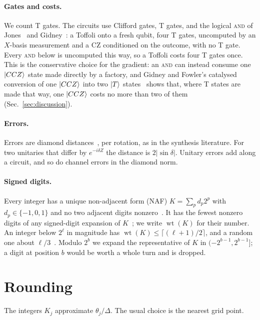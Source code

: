 \documentclass[aps,prx,twocolumn,superscriptaddress,nofootinbib,longbibliography]{revtex4-2}
\theoremstyle{remark}
\newcommand{\AND}{\textup{\textsc{and}}}
\newcommand{\wt}{\operatorname{wt}}
\begin{document}
\paragraph*{Gates and costs.}
We count T gates. The circuits use Clifford gates, T gates, and the logical \AND{} of
Jones~\cite{Jones2013} and Gidney~\cite{Gidney2018}: a Toffoli onto a fresh qubit, four T
gates, uncomputed by an $X$-basis measurement and a CZ conditioned on the outcome, with no T
gate. Every \AND{} below is uncomputed this way, so a Toffoli costs four T gates once. This is
the conservative choice for the gradient: an \AND{} can instead consume one $\ket{CCZ}$ state
made directly by a factory, and Gidney and Fowler's catalysed conversion of one $\ket{CCZ}$ into
two $\ket T$ states~\cite{Gidney2019} shows that, where T states are made that way, one
$\ket{CCZ}$ costs no more than two of them (Sec.~\ref{sec:discussion}).

\paragraph*{Errors.}
Errors are diamond distances~\cite{Aharonov1998}, per rotation, as in the synthesis
literature. For two unitaries that differ by $e^{-i\delta Z}$ the distance is $2|\sin\delta|$.
Unitary errors add along a circuit, and so do channel errors in the diamond norm.

\paragraph*{Signed digits.}
Every integer has a unique non-adjacent form (NAF) $K=\sum_pd_p2^p$ with $d_p\in\{-1,0,1\}$
and no two adjacent digits nonzero~\cite{Reitwiesner1960}. It has the fewest nonzero digits of
any signed-digit expansion of $K$~\cite{Reitwiesner1960,Arno1993}; we write $\wt(K)$ for their
number. An integer below $2^\ell$ in magnitude has $\wt(K)\le\lceil(\ell+1)/2\rceil$, and a
random one about $\ell/3$~\cite{Arno1993}. Modulo $2^b$ we expand the representative of $K$ in
$(-2^{b-1},2^{b-1}]$; a digit at position $b$ would be worth a whole turn and is dropped.

\section{Rounding}\label{sec:rounding}

The integers $K_j$ approximate $\theta_j/\Delta$. The usual choice is the nearest grid point.
\end{document}
